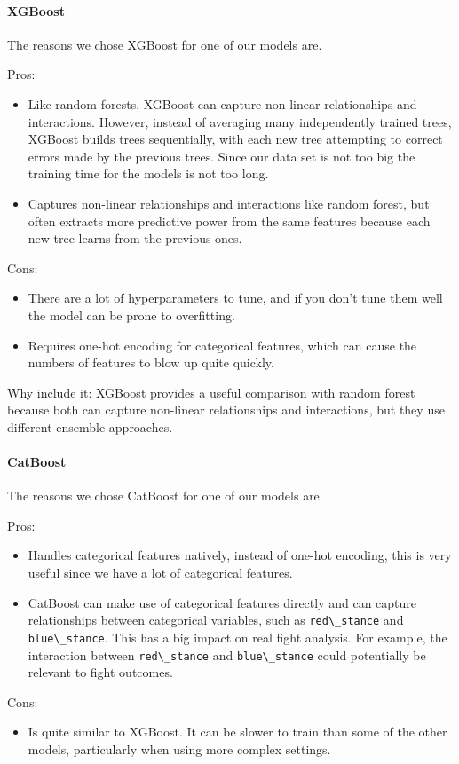 \documentclass[11pt]{article}
\begin{document}
\paragraph*{XGBoost}
The reasons we chose XGBoost for one of our models are.

Pros:
\begin{itemize}
    \item Like random forests, XGBoost can capture non-linear relationships and interactions. However, instead of averaging many independently trained trees, XGBoost builds trees sequentially, with each new tree attempting to correct errors made by the previous trees. Since our data set is not too big the training time for the models is not too long.
    \item Captures non-linear relationships and interactions like random forest, but often extracts more predictive power from the same features because each new tree learns from the previous ones.
\end{itemize}
Cons:
\begin{itemize}
    \item There are a lot of hyperparameters to tune, and if you don't tune them well the model can be prone to overfitting.
    \item Requires one-hot encoding for categorical features, which can cause the numbers of features to blow up quite quickly.
\end{itemize}

Why include it: XGBoost provides a useful comparison with random forest because both can capture non-linear relationships and interactions, but they use different ensemble approaches.

\paragraph*{CatBoost}
The reasons we chose CatBoost for one of our models are.

Pros:
\begin{itemize}
    \item Handles categorical features natively, instead of one-hot encoding, this is very useful since we have a lot of categorical features.
    \item CatBoost can make use of categorical features directly and can capture relationships between categorical variables, such as \verb|red\_stance| and \verb|blue\_stance|. This has a big impact on real fight analysis.
    For example, the interaction between \verb|red\_stance| and \verb|blue\_stance| could potentially be relevant to fight outcomes.
\end{itemize}
Cons:
\begin{itemize}
\item Is quite similar to XGBoost. It can be slower to train than some of the other models, particularly when using more complex settings.
\end{itemize}
\end{document}
